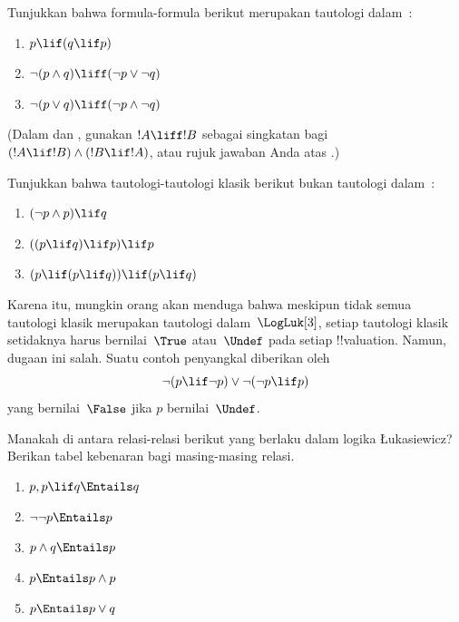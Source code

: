 \documentclass[../../../include/open-logic-section]{subfiles}
\begin{document}
\begin{prob}
  Tunjukkan bahwa formula-formula berikut merupakan tautologi
  dalam~\LogLuk[3]:
  \begin{enumerate}
    \item $p\lif(q\lif p)$
    \item\label{mvl:thr:luk:prob:luk-taut-2} $\lnot(p\land q)\liff(\lnot p\lor\lnot q)$
    \item\label{mvl:thr:luk:prob:luk-taut-3} $\lnot(p\lor q)\liff(\lnot p\land\lnot q)$
  \end{enumerate}
  (Dalam  dan
  , gunakan $!A\liff !B$ sebagai
  singkatan bagi $(!A\lif !B)\land(!B\lif !A)$, atau rujuk jawaban Anda
  atas .)
\end{prob}

\begin{prob}
  Tunjukkan bahwa tautologi-tautologi klasik berikut bukan tautologi
  dalam~\LogLuk[3]:
  \begin{enumerate}
    \item $(\lnot p\land p)\lif q$
    \item $((p\lif q)\lif p)\lif p$
    \item $(p\lif(p\lif q))\lif(p\lif q)$
  \end{enumerate}
\end{prob}

Karena itu, mungkin orang akan menduga bahwa meskipun tidak semua tautologi
klasik merupakan tautologi dalam~$\LogLuk[3]$, setiap tautologi klasik
setidaknya harus bernilai~$\True$ atau~$\Undef$ pada setiap !!{valuation}.
Namun, dugaan ini salah. Suatu contoh penyangkal diberikan oleh
\[
  \lnot(p\lif\lnot p)\lor\lnot(\lnot p\lif p)
\]
yang bernilai~$\False$ jika $p$ bernilai~$\Undef$.

\begin{prob}
  Manakah di antara relasi-relasi berikut yang berlaku dalam logika
  \L ukasiewicz? Berikan tabel kebenaran bagi masing-masing relasi.
  \begin{enumerate}
    \item $p,p\lif q\Entails q$
    \item $\lnot\lnot p\Entails p$
    \item $p\land q\Entails p$
    \item $p\Entails p\land p$
    \item $p\Entails p\lor q$
  \end{enumerate}
\end{prob}
\end{document}
